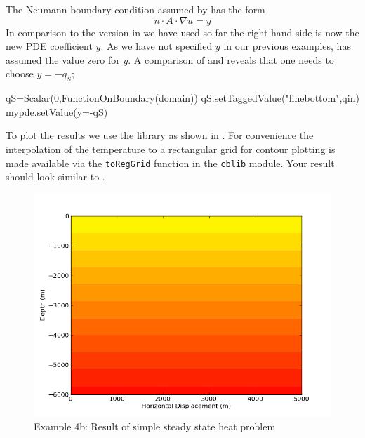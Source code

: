 The Neumann boundary condition assumed by \esc has the form
\begin{equation}\label{NEUMAN 2b}
n\cdot A \cdot\nabla u = y 
\end{equation}
In comparison to the version in  we have used so far the right
hand side is now the new PDE coefficient $y$. As we have not specified $y$ in
our previous examples, \esc has assumed the value zero for $y$. A comparison of
 and  reveals that one needs to choose
$y=-q_{S}$;
\begin{python}
qS=Scalar(0,FunctionOnBoundary(domain))
qS.setTaggedValue("linebottom",qin)
mypde.setValue(y=-qS)
\end{python}
To plot the results we use the \modmpl library as shown in
. For convenience the interpolation of the temperature to
a rectangular grid for contour plotting is made available via the
\verb|toRegGrid| function in the \verb|cblib| module. Your result should look
similar to .

\begin{figure}[ht]
\centerline{\includegraphics[width=4.in]{figures/simpleheat}}
\caption{Example 4b: Result of simple steady state heat problem}
\label{fig:steady state heat}
\end{figure}
\clearpage

